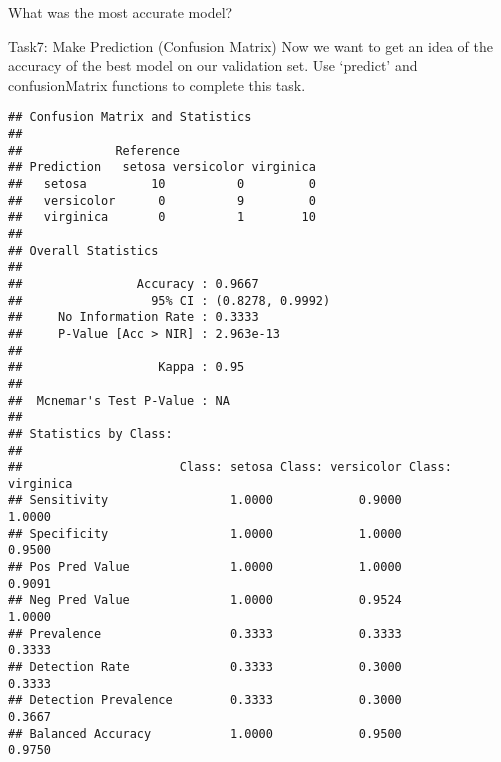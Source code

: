 \documentclass[
]{article}
\newenvironment{Shaded}{\begin{snugshade}}{\end{snugshade}}
\newcommand{\AttributeTok}[1]{\textcolor[rgb]{0.77,0.63,0.00}{#1}}
\newcommand{\CommentTok}[1]{\textcolor[rgb]{0.56,0.35,0.01}{\textit{#1}}}
\newcommand{\FunctionTok}[1]{\textcolor[rgb]{0.00,0.00,0.00}{#1}}
\newcommand{\NormalTok}[1]{#1}
\newcommand{\OtherTok}[1]{\textcolor[rgb]{0.56,0.35,0.01}{#1}}
\newcommand{\SpecialCharTok}[1]{\textcolor[rgb]{0.00,0.00,0.00}{#1}}
\begin{document}
What was the most accurate model?

Task7: Make Prediction (Confusion Matrix) Now we want to get an idea of
the accuracy of the best model on our validation set. Use `predict' and
confusionMatrix functions to complete this task.

\begin{Shaded}
\end{Shaded}

\begin{verbatim}
## Confusion Matrix and Statistics
## 
##             Reference
## Prediction   setosa versicolor virginica
##   setosa         10          0         0
##   versicolor      0          9         0
##   virginica       0          1        10
## 
## Overall Statistics
##                                           
##                Accuracy : 0.9667          
##                  95% CI : (0.8278, 0.9992)
##     No Information Rate : 0.3333          
##     P-Value [Acc > NIR] : 2.963e-13       
##                                           
##                   Kappa : 0.95            
##                                           
##  Mcnemar's Test P-Value : NA              
## 
## Statistics by Class:
## 
##                      Class: setosa Class: versicolor Class: virginica
## Sensitivity                 1.0000            0.9000           1.0000
## Specificity                 1.0000            1.0000           0.9500
## Pos Pred Value              1.0000            1.0000           0.9091
## Neg Pred Value              1.0000            0.9524           1.0000
## Prevalence                  0.3333            0.3333           0.3333
## Detection Rate              0.3333            0.3000           0.3333
## Detection Prevalence        0.3333            0.3000           0.3667
## Balanced Accuracy           1.0000            0.9500           0.9750
\end{verbatim}
\end{document}
